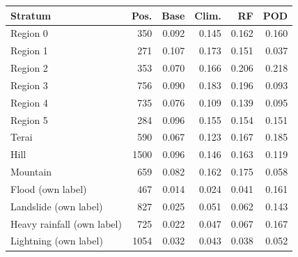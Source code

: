\begin{tabular}{lrrrrr}
\toprule
Stratum & Pos. & Base & Clim. & RF & POD \\
\midrule
Region 0 & 350 & 0.092 & 0.145 & 0.162 & 0.160 \\
Region 1 & 271 & 0.107 & 0.173 & 0.151 & 0.037 \\
Region 2 & 353 & 0.070 & 0.166 & 0.206 & 0.218 \\
Region 3 & 756 & 0.090 & 0.183 & 0.196 & 0.093 \\
Region 4 & 735 & 0.076 & 0.109 & 0.139 & 0.095 \\
Region 5 & 284 & 0.096 & 0.155 & 0.154 & 0.151 \\
\addlinespace[2pt]
Terai & 590 & 0.067 & 0.123 & 0.167 & 0.185 \\
Hill & 1500 & 0.096 & 0.146 & 0.163 & 0.119 \\
Mountain & 659 & 0.082 & 0.162 & 0.175 & 0.058 \\
\addlinespace[2pt]
Flood (own label) & 467 & 0.014 & 0.024 & 0.041 & 0.161 \\
Landslide (own label) & 827 & 0.025 & 0.051 & 0.062 & 0.143 \\
Heavy rainfall (own label) & 725 & 0.022 & 0.047 & 0.067 & 0.167 \\
Lightning (own label) & 1054 & 0.032 & 0.043 & 0.038 & 0.052 \\
\bottomrule
\end{tabular}
